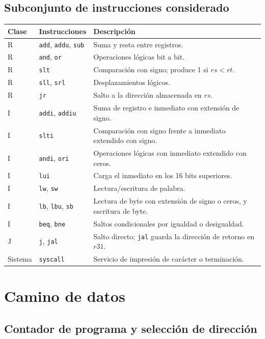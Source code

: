 \documentclass[11pt,a4paper]{article}
\begin{document}
\subsection{Subconjunto de instrucciones considerado}

\begin{longtable}{@{}llp{8.2cm}@{}}
\toprule
\textbf{Clase} & \textbf{Instrucciones} & \textbf{Descripción} \\
\midrule
R & \texttt{add}, \texttt{addu}, \texttt{sub} & Suma y resta entre registros. \\
R & \texttt{and}, \texttt{or} & Operaciones lógicas bit a bit. \\
R & \texttt{slt} & Comparación con signo; produce 1 si $rs<rt$. \\
R & \texttt{sll}, \texttt{srl} & Desplazamientos lógicos. \\
R & \texttt{jr} & Salto a la dirección almacenada en $rs$. \\
I & \texttt{addi}, \texttt{addiu} & Suma de registro e inmediato con extensión de signo. \\
I & \texttt{slti} & Comparación con signo frente a inmediato extendido con signo. \\
I & \texttt{andi}, \texttt{ori} & Operaciones lógicas con inmediato extendido con ceros. \\
I & \texttt{lui} & Carga el inmediato en los 16 bits superiores. \\
I & \texttt{lw}, \texttt{sw} & Lectura/escritura de palabra. \\
I & \texttt{lb}, \texttt{lbu}, \texttt{sb} & Lectura de byte con extensión de signo o ceros, y escritura de byte. \\
I & \texttt{beq}, \texttt{bne} & Saltos condicionales por igualdad o desigualdad. \\
J & \texttt{j}, \texttt{jal} & Salto directo; \texttt{jal} guarda la dirección de retorno en $r31$. \\
Sistema & \texttt{syscall} & Servicio de impresión de carácter o terminación. \\
\bottomrule
\end{longtable}

\section{Camino de datos}

\subsection{Contador de programa y selección de dirección}
\end{document}
